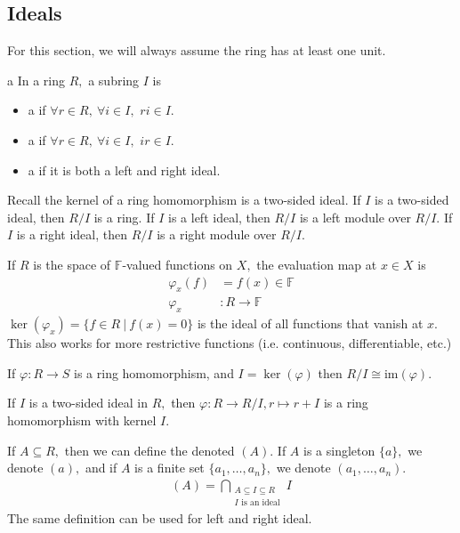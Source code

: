 \documentclass[a4paper]{article}
\begin{document}
\subsection{Ideals}
For this section, we will always assume the ring has at least one unit.
\begin{definition}[Ideal]a
    In a ring $R,$ a subring $I$ is \begin{itemize}
        \item a  if $\forall r\in R,~\forall i\in I,$ $ri\in I.$ 
        \item a  if $\forall r\in R,~\forall i\in I,$ $ir\in I.$
        \item a  if it is both a left and right ideal.
    \end{itemize}
\end{definition}
Recall the kernel of a ring homomorphism is a two-sided ideal. If $I$ is a two-sided ideal, then $R/I$ is a ring. If $I$ is a left ideal, then $R/I$ is a left module over $R/I.$ If $I$ is a right ideal, then $R/I$ is a right module over $R/I.$
\begin{example}
    If $R$ is the space of $\mathbb F$-valued functions on $X,$ the evaluation map at $x\in X$ is \begin{align}
        \varphi_x(f)&=f(x)\in\mathbb F\\
        \varphi_x&:R\to\mathbb F
    \end{align}
    $\ker(\varphi_x)=\{f\in R~|~f(x)=0\}$ is the ideal of all functions that vanish at $x.$ This also works for more restrictive functions (i.e. continuous, differentiable, etc.) 
\end{example}
\begin{theorem}
    If $\varphi:R\to S$ is a ring homomorphism, and $I=\ker(\varphi)$ then $R/I\cong\mathrm{im}(\varphi).$

    If $I$ is a two-sided ideal in $R,$ then $\varphi:R\to R/I,r\mapsto r+I$ is a ring homomorphism with kernel $I.$
\end{theorem}
If $A\subseteq R,$ then we can define the  denoted $(A).$ If $A$ is a singleton $\{a\},$ we denote $(a),$ and if $A$ is a finite set $\{a_1,\ldots,a_n\},$ we denote $(a_1,\ldots,a_n).$ \begin{align}
    (A)=\bigcap_{\substack{A\subseteq I\subseteq R\\I\text{ is an ideal}}}I
\end{align}
The same definition can be used for left and right ideal.
\end{document}
